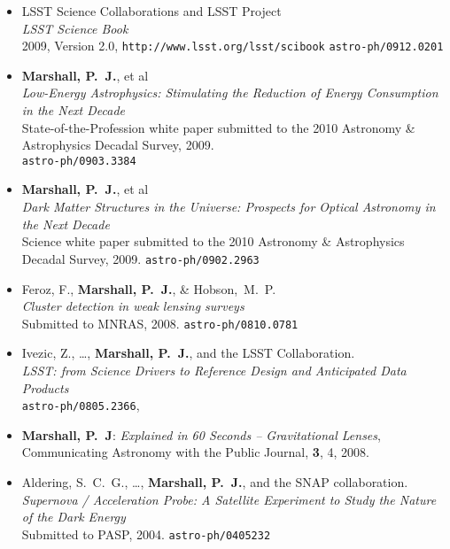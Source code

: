 \begin{itemize}


\item{LSST Science Collaborations and LSST Project \\
\textit{LSST Science Book}\\
2009, Version 2.0, \texttt{http://www.lsst.org/lsst/scibook}
\texttt{astro-ph/0912.0201}
}

\item{\textbf{{Marshall}, P.~J.}, et al\\
\textit{Low-Energy Astrophysics: Stimulating the Reduction of Energy
Consumption in the Next Decade}\\
State-of-the-Profession white paper submitted to the 2010 Astronomy \& Astrophysics Decadal Survey, 2009.\\
\texttt{astro-ph/0903.3384}
}

\item{\textbf{{Marshall}, P.~J.}, et al\\
\textit{Dark Matter Structures in the Universe: Prospects for Optical Astronomy in the Next Decade}\\
Science white paper submitted to the 2010 Astronomy \& Astrophysics Decadal Survey, 2009.
\texttt{astro-ph/0902.2963}
}

\item{{Feroz}, F., \textbf{{Marshall}, P.~J.}, \& {Hobson},~M.~P.\\
\textit{Cluster detection in weak lensing surveys}\\
Submitted to MNRAS, 2008.
\texttt{astro-ph/0810.0781}
}

\item{{Ivezic}, Z., \ldots, \textbf{{Marshall}, P.~J.}, and the LSST Collaboration.\\
\textit{LSST: from Science Drivers to Reference Design and Anticipated Data Products}\\
\texttt{astro-ph/0805.2366},
}

\item{\textbf{Marshall, P.~J}:
\textit{Explained in 60 Seconds -- Gravitational Lenses},\\
Communicating Astronomy with the Public Journal, \textbf{3}, 4, 2008.
}

\item{{Aldering}, S.~C.~G., \ldots, \textbf{{Marshall}, P.~J.}, and the SNAP collaboration.\\
\textit{Supernova / Acceleration Probe: A Satellite Experiment to Study the Nature of the Dark Energy}\\
Submitted to PASP, 2004.
\texttt{astro-ph/0405232}
}

\end{itemize}

\vspace{2\baselineskip}

